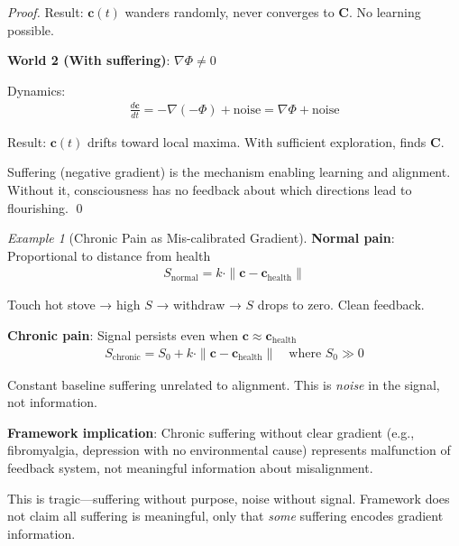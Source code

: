 \documentclass[11pt,a4paper]{article}
\theoremstyle{definition}
\theoremstyle{remark}
\newtheorem{example}{Example}[section]
\newcommand{\cc}{\mathbf{c}}
\begin{document}
\begin{enumerate}
\begin{proof}
Result: \(\cc(t)\) wanders randomly, never converges to \(\mathbf{C}\). No learning possible.

\textbf{World 2 (With suffering)}: \(\nabla \Phi \neq 0\)

Dynamics:
\begin{align}
\frac{d\cc}{dt} = -\nabla(-\Phi) + \text{noise} = \nabla \Phi + \text{noise}
\end{align}

Result: \(\cc(t)\) drifts toward local maxima. With sufficient exploration, finds \(\mathbf{C}\).

Suffering (negative gradient) is the mechanism enabling learning and alignment. Without it, consciousness has no feedback about which directions lead to flourishing. \qed
\end{proof}

\begin{example}[Chronic Pain as Mis-calibrated Gradient]
\textbf{Normal pain}: Proportional to distance from health
\begin{align}
S_{\text{normal}} = k \cdot \|\cc - \cc_{\text{health}}\|
\end{align}

Touch hot stove → high \(S\) → withdraw → \(S\) drops to zero. Clean feedback.

\textbf{Chronic pain}: Signal persists even when \(\cc \approx \cc_{\text{health}}\)
\begin{align}
S_{\text{chronic}} = S_0 + k \cdot \|\cc - \cc_{\text{health}}\| \quad \text{where } S_0 \gg 0
\end{align}

Constant baseline suffering unrelated to alignment. This is \textit{noise} in the signal, not information.

\textbf{Framework implication}: Chronic suffering without clear gradient (e.g., fibromyalgia, depression with no environmental cause) represents malfunction of feedback system, not meaningful information about misalignment.

This is tragic—suffering without purpose, noise without signal. Framework does not claim all suffering is meaningful, only that \textit{some} suffering encodes gradient information.
\end{example}

\begin{figure}[H]
\centering
{}
\end{figure}
\end{enumerate}
\end{document}

